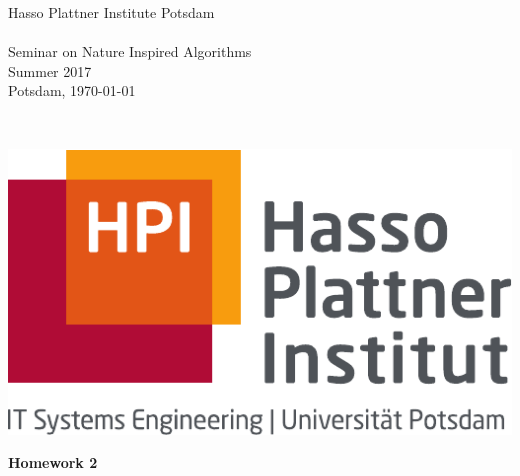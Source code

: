 \documentclass[12pt,a4paper]{article}
\begin{document}
\noindent
\begin{minipage}{0.66\textwidth}
Hasso Plattner Institute Potsdam\\
\\
Seminar on Nature Inspired Algorithms\\ Summer 2017\\
Potsdam, \today
\end{minipage}
~
\begin{minipage}{0.30\textwidth}
\includegraphics[width=\textwidth]{../homework_template/Hasso_Plattner_Institut_Logo}
\end{minipage}


\begin{center}
 {\LARGE \textbf{Homework 2}}
 \vspace*{0.5cm}\\
 {\SMALL {}}
\end{center}
\end{document}
